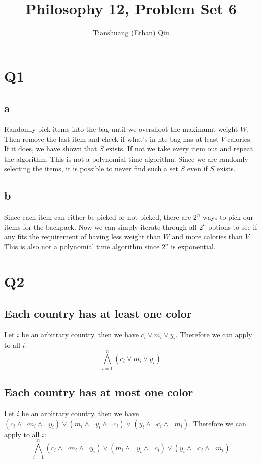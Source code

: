 \documentclass[12pt]{article}
\author{Tianshuang (Ethan) Qiu}
\begin{document}
\title{Philosophy 12, Problem Set 6}
\maketitle

\section{Q1}
\subsection{a}
Randomly pick items into the bag until we overshoot the maximumt weight $W$. Then
remove the last item and check if what's in hte bag has at least $V$ calories. If
it does, we have shown that $S$ exists. If not we take every item out and repeat
the algorithm.
\newline
This is not a polynomial time algorithm. Since we are randomly selecting the items,
it is possible to never find such a set $S$ even if $S$ exists.

\subsection{b}
Since each item can either be picked or not picked, there are $2^n$ ways to pick
our items for the backpack. Now we can simply iterate through all $2^n$ options to
see if any fits the requirement of having less weight than $W$ and more calories than
$V$.
\newline
This is also not a polynomial time algorithm since $2^n$ is exponential.


\section{Q2}
\subsection{Each country has at least one color}
Let $i$ be an arbitrary country, then we have $c_i \lor m_i \lor y_i$. Therefore we can apply
to all $i$:
\[\bigwedge _{i = 1} ^n (c_i \lor m_i \lor y_i)\]

\subsection{Each country has at most one color}
Let $i$ be an arbitrary country, then we have $(c_i \land \neg m_i \land \neg y_i) \lor
(m_i \land \neg y_i \land \neg c_i) \lor (y_i \land \neg c_i \land \neg m_i)$.
Therefore we can apply
to all $i$:
\[\bigwedge _{i = 1} ^n (c_i \land \neg m_i \land \neg y_i) \lor
(m_i \land \neg y_i \land \neg c_i) \lor (y_i \land \neg c_i \land \neg m_i)\]
\end{document}
